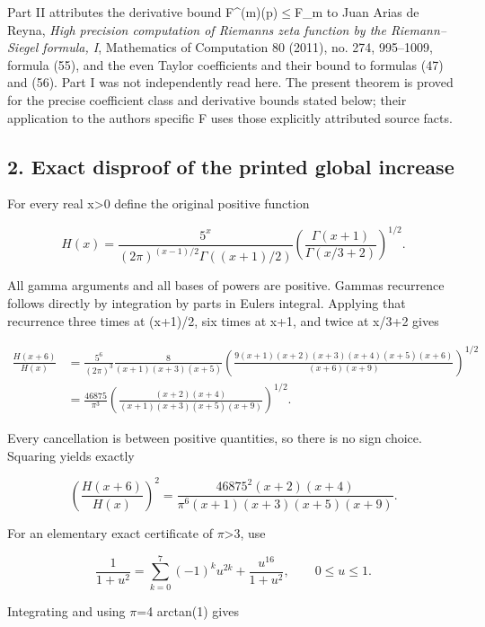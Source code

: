 \documentclass[11pt]{article}
\begin{document}
Part II attributes the derivative bound \textbar F\^{}(m)(p)\textbar\ensuremath{\le}F\_m to Juan Arias de Reyna, \emph{High precision computation of Riemann\textquotesingle s zeta function by the Riemann--Siegel formula, I}, Mathematics of Computation 80 (2011), no. 274, 995--1009, formula (55), and the even Taylor coefficients and their bound to formulas (47) and (56). Part I was not independently read here. The present theorem is proved for the precise coefficient class and derivative bounds stated below; their application to the author\textquotesingle s specific F uses those explicitly attributed source facts.

\subsection{2. Exact disproof of the printed global increase}\label{aindependent:exact-disproof-of-the-printed-global-increase}

For every real x\textgreater0 define the original positive function

\[
H(x)=\frac{5^x}{(2\pi)^{(x-1)/2}\Gamma((x+1)/2)}
\left(\frac{\Gamma(x+1)}{\Gamma(x/3+2)}\right)^{1/2}.
\]

All gamma arguments and all bases of powers are positive. Gamma\textquotesingle s recurrence follows directly by integration by parts in Euler\textquotesingle s integral. Applying that recurrence three times at (x+1)/2, six times at x+1, and twice at x/3+2 gives

\[
\begin{aligned}
\frac{H(x+6)}{H(x)}
&=\frac{5^6}{(2\pi)^3}
\frac{8}{(x+1)(x+3)(x+5)}
\left(\frac{9(x+1)(x+2)(x+3)(x+4)(x+5)(x+6)}
{(x+6)(x+9)}\right)^{1/2}\\
&=\frac{46875}{\pi^3}
\left(\frac{(x+2)(x+4)}
{(x+1)(x+3)(x+5)(x+9)}\right)^{1/2}.
\end{aligned}
\]

Every cancellation is between positive quantities, so there is no sign choice. Squaring yields exactly

\[
\boxed{\left(\frac{H(x+6)}{H(x)}\right)^2
=\frac{46875^2(x+2)(x+4)}
{\pi^6(x+1)(x+3)(x+5)(x+9)}.}
\]

For an elementary exact certificate of \ensuremath{\pi}\textgreater3, use

\[
\frac1{1+u^2}=\sum_{k=0}^{7}(-1)^k u^{2k}
+\frac{u^{16}}{1+u^2},\qquad 0\le u\le1.
\]

Integrating and using \ensuremath{\pi}=4 arctan(1) gives
\end{document}
